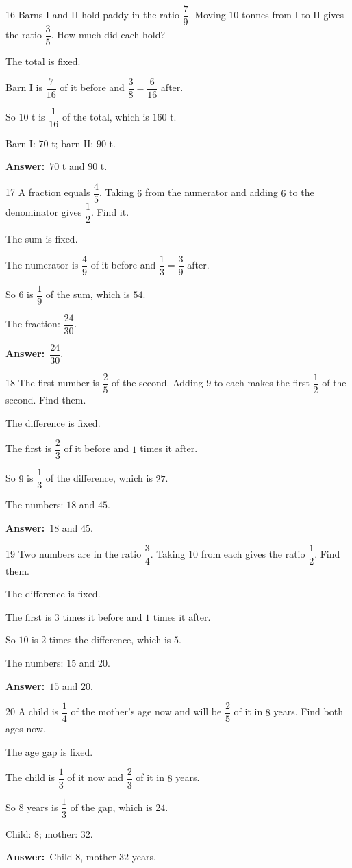 \documentclass[11pt]{article}
\newif\ifsol \solfalse
\providecommand{\AnsWord}{Đáp số}
\newcommand{\dapso}[1]{\par\textbf{\AnsWord:}\ #1}
\newcommand{\probsol}[1]{%
  \begin{lrbox}{\solmeasure}\begin{minipage}{\dimexpr\linewidth-24pt\relax}#1\end{minipage}\end{lrbox}%
  \ifsol
    \begin{solbox}#1\end{solbox}%
  \else
    \setlength{\solht}{\dimexpr\ht\solmeasure+\dp\solmeasure+0.85cm\relax}%
    \ifdim\solht<1.35cm\setlength{\solht}{1.35cm}\fi
    \begin{tcolorbox}[colback=white,colframe=Line,boxrule=0.8pt,arc=5pt,
      left=8pt,right=8pt,top=4pt,bottom=4pt,height=\solht]{\footnotesize\color{Slate}\itshape\WorkWord}\end{tcolorbox}%
  \fi}
\newcommand{\gap}{\vspace{0.3cm}}
\def\WorkWord{Your work:}
\def\AnsWord{Answer}
\begin{document}
\gap
\begin{probbox}{16}{\relax}
Barns I and II hold paddy in the ratio $\dfrac79$. Moving $10$ tonnes from I to II gives the ratio $\dfrac35$. How much did each hold?
\end{probbox}
\probsol{
The total is fixed.\par Barn I is $\dfrac7{16}$ of it before and $\dfrac38=\dfrac6{16}$ after.\par So $10$ t is $\dfrac1{16}$ of the total, which is $160$ t.\par Barn I: $70$ t; barn II: $90$ t.
\dapso{$70$ t and $90$ t.}}
\gap
\begin{probbox}{17}{\relax}
A fraction equals $\dfrac45$. Taking $6$ from the numerator and adding $6$ to the denominator gives $\dfrac12$. Find it.
\end{probbox}
\probsol{
The sum is fixed.\par The numerator is $\dfrac49$ of it before and $\dfrac13=\dfrac39$ after.\par So $6$ is $\dfrac19$ of the sum, which is $54$.\par The fraction: $\dfrac{24}{30}$.
\dapso{$\dfrac{24}{30}$.}}
\gap
\begin{probbox}{18}{\relax}
The first number is $\dfrac25$ of the second. Adding $9$ to each makes the first $\dfrac12$ of the second. Find them.
\end{probbox}
\probsol{
The difference is fixed.\par The first is $\dfrac23$ of it before and $1$ times it after.\par So $9$ is $\dfrac13$ of the difference, which is $27$.\par The numbers: $18$ and $45$.
\dapso{$18$ and $45$.}}
\gap
\begin{probbox}{19}{\relax}
Two numbers are in the ratio $\dfrac34$. Taking $10$ from each gives the ratio $\dfrac12$. Find them.
\end{probbox}
\probsol{
The difference is fixed.\par The first is $3$ times it before and $1$ times it after.\par So $10$ is $2$ times the difference, which is $5$.\par The numbers: $15$ and $20$.
\dapso{$15$ and $20$.}}
\gap
\begin{probbox}{20}{\relax}
A child is $\dfrac14$ of the mother's age now and will be $\dfrac25$ of it in $8$ years. Find both ages now.
\end{probbox}
\probsol{
The age gap is fixed.\par The child is $\dfrac13$ of it now and $\dfrac23$ of it in $8$ years.\par So $8$ years is $\dfrac13$ of the gap, which is $24$.\par Child: $8$; mother: $32$.
\dapso{Child $8$, mother $32$ years.}}
\end{document}
